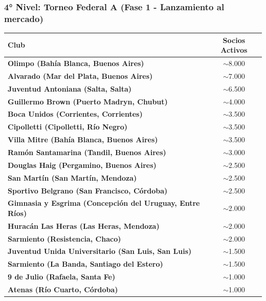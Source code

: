 \newpage

\subsubsection{4° Nivel: Torneo Federal A (Fase 1 - Lanzamiento al mercado)}

\begin{table}[h!]
\centering
\renewcommand{\arraystretch}{1.1}
\begin{tabularx}{\textwidth}{|X|c|}
\hline
\rowcolor{gray!20} \textbf{Club} & \textbf{Socios Activos} \\ \hline
\textbf{Olimpo (Bahía Blanca, Buenos Aires)} & $\sim$8.000 \\ \hline
\textbf{Alvarado (Mar del Plata, Buenos Aires)} & $\sim$7.000 \\ \hline
\textbf{Juventud Antoniana (Salta, Salta)} & $\sim$6.500 \\ \hline
\textbf{Guillermo Brown (Puerto Madryn, Chubut)} & $\sim$4.000 \\ \hline
\textbf{Boca Unidos (Corrientes, Corrientes)} & $\sim$3.500 \\ \hline
\textbf{Cipolletti (Cipolletti, Río Negro)} & $\sim$3.500 \\ \hline
\textbf{Villa Mitre (Bahía Blanca, Buenos Aires)} & $\sim$3.500 \\ \hline
\textbf{Ramón Santamarina (Tandil, Buenos Aires)} & $\sim$3.000 \\ \hline
\textbf{Douglas Haig (Pergamino, Buenos Aires)} & $\sim$2.500 \\ \hline
\textbf{San Martín (San Martín, Mendoza)} & $\sim$2.500 \\ \hline
\textbf{Sportivo Belgrano (San Francisco, Córdoba)} & $\sim$2.500 \\ \hline
\textbf{Gimnasia y Esgrima (Concepción del Uruguay, Entre Ríos)} & $\sim$2.000 \\ \hline
\textbf{Huracán Las Heras (Las Heras, Mendoza)} & $\sim$2.000 \\ \hline
\textbf{Sarmiento (Resistencia, Chaco)} & $\sim$2.000 \\ \hline
\textbf{Juventud Unida Universitario (San Luis, San Luis)} & $\sim$1.500 \\ \hline
\textbf{Sarmiento (La Banda, Santiago del Estero)} & $\sim$1.500 \\ \hline
\textbf{9 de Julio (Rafaela, Santa Fe)} & $\sim$1.000 \\ \hline
\textbf{Atenas (Río Cuarto, Córdoba)} & $\sim$1.000 \\ \hline

\end{tabularx}
\end{table}
